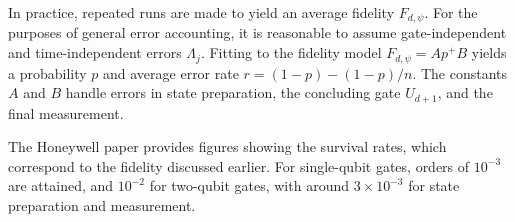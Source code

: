 \documentclass[12pt,a4paper]{amsart}
\numberwithin{equation}{section}
\theoremstyle{plain}
\theoremstyle{definition}
\begin{document}
In practice, repeated runs are made to yield an average fidelity
$
F_{d,\psi} 
$.
For the purposes of general error accounting, it is reasonable to assume gate-independent and time-independent errors $\Lambda_j$. 
Fitting to the fidelity model
$F_{d,\psi} = Ap^ + B$
yields a probability $p$ and
average error rate 
$r = (1 - p) - (1 - p)/n$. The constants $A$ and $B$ handle errors in state preparation, the concluding gate $U_{d+1}$, and the final measurement.



The Honeywell paper provides figures showing the survival rates, which correspond to the fidelity discussed earlier. For single-qubit gates, orders of $10^{-3}$ are attained, and $10^{-2}$ for two-qubit gates, with around $3\times10^{-3}$ for state preparation and measurement.
\end{document}
